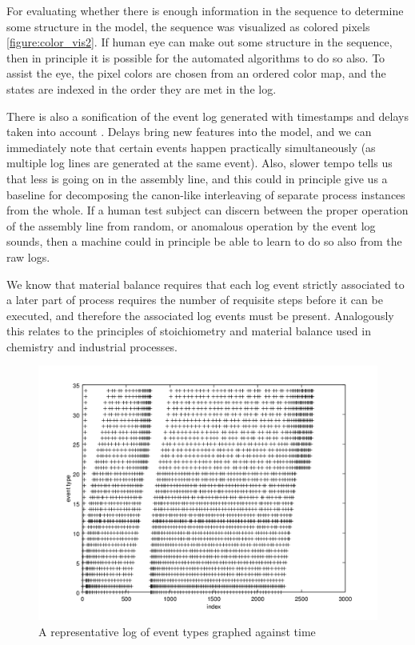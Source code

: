 \documentclass[journal]{IEEEtran}
\begin{document}
For evaluating whether there is enough information in the sequence to determine some structure in the model, the sequence was visualized as colored pixels \ref{figure:color_vis2}.
If human eye can make out some structure in the sequence, then in principle it is possible for the automated algorithms to do so also. To assist the eye, the pixel colors are chosen
from an ordered color map, and the states are indexed in the order they are met in the log.

There is also a sonification\cite{refKra} of the event log generated with timestamps and delays taken into account \cite{PHONOZATION}. Delays bring new features into the model, and
we can immediately note that certain events happen practically simultaneously (as multiple log lines are generated at the same event). Also, slower tempo tells us that less is
going on in the assembly line, and this could in principle give us a baseline for decomposing the canon-like interleaving of separate process instances from the whole.
If a human test subject can discern between the proper operation of the assembly line from random, or anomalous operation by the event log sounds,
then a machine could in principle be able to learn to do so also from the raw logs.

We know that material balance requires that each log event strictly associated to a later part of process requires the number of requisite steps before it can be executed, and
therefore the associated log events must be present. Analogously this relates to the principles of stoichiometry and material balance used in chemistry and industrial processes.

\begin{figure}[tb]
 \centering
 \includegraphics[width=8 cm,keepaspectratio=true]{./events.png}
 \caption{A representative log of event types graphed against time}
 \label{figure:events}
\end{figure}
\end{document}
